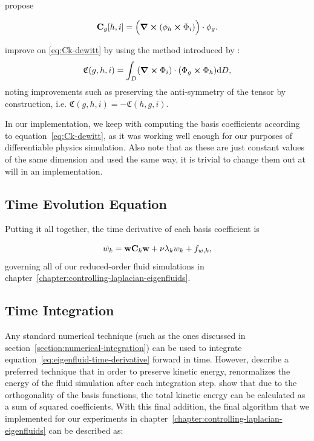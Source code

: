 \citet{dewitt} propose 

\begin{equation}\label{eq:Ck-dewitt}
\vb{C}_g[h, i] = \Big( \curl(\phi_h \cross \Phi_i)\Big)\cdot \phi_g.
\end{equation}

\citet{scalable-eigenfluids} improve on \eqref{eq:Ck-dewitt} by using the method
introduced by \citet{ModelReductionFluidSim}:
\begin{equation}
    \mathfrak{C}(g,h,i) = \int_D (\curl{\Phi_i})\cdot (\Phi_g \cross \Phi_h)
    \text{d}D,
\end{equation}
noting improvements such as preserving the anti-symmetry of the tensor by
construction, i.e. $\mathfrak{C}(g,h,i) = -\mathfrak{C}(h,g,i)$. 

In our implementation, we keep with computing the basis coefficients according
to equation~\eqref{eq:Ck-dewitt}, as it was working well enough for our purposes
of differentiable physics simulation. Also note that as these are just constant
values of the same dimension and used the same way, it is trivial to change them
out at will in an implementation.

\subsection*{Time Evolution Equation}
Putting it all together, the time derivative of each basis coefficient is

\begin{equation}
    \dot{w_k} = \vb{w}\vb{C}_k\vb{w} + \nu \lambda_k w_k + f_{w,k},
\label{eq:eigenfluid-time-derivative}
\end{equation}
governing all of our reduced-order fluid simulations in
chapter~\ref{chapter:controlling-laplacian-eigenfluids}.

\subsection*{Time Integration} 
Any standard numerical technique (such as the ones discussed in
section~\ref{section:numerical-integration}) can be used to integrate
equation~\eqref{eq:eigenfluid-time-derivative} forward in time. However,
\citet{dewitt} describe a preferred technique that in order to preserve kinetic
energy, renormalizes the energy of the fluid simulation after each integration
step. \citet{dewitt} show that due to the orthogonality of the basis functions,
the total kinetic energy can be calculated as a sum of squared coefficients.
With this final addition, the final algorithm that we implemented for our
experiments in chapter~\ref{chapter:controlling-laplacian-eigenfluids} can be
described as:

